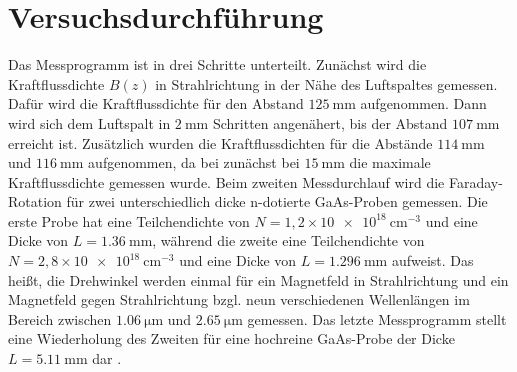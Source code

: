 \section{Versuchsdurchführung}
\label{sec:Versuchsdurchführung}

Das Messprogramm ist in drei Schritte unterteilt.
Zunächst wird die Kraftflussdichte $B(z)$ in Strahlrichtung in der Nähe des 
Luftspaltes gemessen. Dafür wird die Kraftflussdichte für den Abstand $\SI{125}{\milli\meter}$
aufgenommen. Dann wird sich dem Luftspalt in $\SI{2}{\milli\meter}$ Schritten 
angenähert, bis der Abstand $\SI{107}{\milli\meter}$ erreicht ist. 
Zusätzlich wurden die Kraftflussdichten für die Abstände $\SI{114}{\milli\meter}$
und $\SI{116}{\milli\meter}$ aufgenommen, da bei zunächst bei $\SI{15}{\milli\meter}$
die maximale Kraftflussdichte gemessen wurde.
Beim zweiten Messdurchlauf wird die Faraday-Rotation für zwei unterschiedlich dicke 
n-dotierte GaAs-Proben gemessen. 
Die erste Probe hat eine Teilchendichte von $N = 1,2 \times \SI{10e18}{\centi\meter^{-3}}$ 
und eine Dicke von $L = \SI{1,36}{\milli\meter}$, während die zweite eine 
Teilchendichte von $N = 2,8 \times \SI{10e18}{\centi\meter^{-3}}$ 
und eine Dicke von $L = \SI{1,296}{\milli\meter}$ aufweist.
Das heißt, die Drehwinkel werden einmal für ein 
Magnetfeld in Strahlrichtung und ein Magnetfeld gegen Strahlrichtung bzgl. neun 
verschiedenen Wellenlängen im Bereich zwischen $\SI{1,06}{\micro\meter}$ 
und $\SI{2,65}{\micro\meter}$ gemessen.
Das letzte Messprogramm stellt eine Wiederholung des Zweiten für eine hochreine 
GaAs-Probe der Dicke $L = \SI{5,11}{\milli\meter}$ dar \cite{sample}.